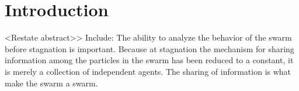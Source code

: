 \section{Introduction}
\label{sec:introduction}

<Restate abstract>>
Include:
The ability to analyze the behavior of the swarm before stagnation is important. Because at stagnation the mechanism for sharing information among the particles in the swarm has been reduced to a constant, it is merely a collection of independent agents.
The sharing of information is what make the swarm a swarm. 
